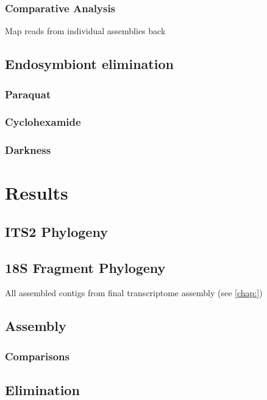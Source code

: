 \subsubsection{Comparative Analysis}
Map reads from individual assemblies back




\subsection{Endosymbiont elimination}

\subsubsection{Paraquat}

\subsubsection{Cyclohexamide}

\subsubsection{Darkness}




\section{Results}

\subsection{ITS2 Phylogeny}



\subsection{18S Fragment Phylogeny}

All assembled contigs from final transcriptome assembly (see \ref{chap:})


\subsection{Assembly}
\subsubsection{Comparisons}
\subsection{Elimination}
